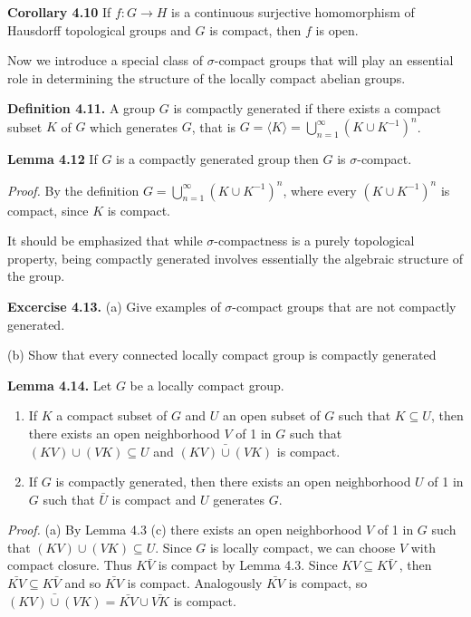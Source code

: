 \documentclass[12pt]{article}
\begin{document}
\textbf{Corollary 4.10} If $f : G \to H$ is a continuous surjective homomorphism of Hausdorff topological groups and
$G$ is compact, then $f$ is open.


Now we introduce a special class of $\sigma$-compact groups that will play an essential role in determining the
structure of the locally compact abelian groups.


\textbf{Definition 4.11.} A group $G$ is compactly generated if there exists a compact subset $K$ of $G$ which generates
$G$, that is $G = \langle K \rangle =\bigcup^{\infty}_{n=1}(K \cup K^{-1})^n$.


\textbf{Lemma 4.12} If $G$ is a compactly generated group then $G$ is $\sigma$-compact.


\emph{Proof.} By the definition $G =\bigcup^{\infty}_{n=1}(K \cup K^{-1})^n$, where every $(K \cup K^{-1})^n$ is compact, since $K$ is compact.


    It should be emphasized that while $\sigma$-compactness is a purely topological property, being compactly
    generated involves essentially the algebraic structure of the group.


\textbf{Excercise 4.13.} (a) Give examples of $\sigma$-compact groups that are not compactly generated.


(b) Show that every connected locally compact group is compactly generated


\textbf{Lemma 4.14.} Let $G$ be a locally compact group.


\begin{enumerate}

    \item If $K$ a compact subset of $G$ and $U$ an open subset of $G$ such that $K \subseteq U$, then there exists an open
    neighborhood $V$ of 1 in $G$ such that $(KV) \cup (VK) \subseteq U$ and $\bar{(KV) \cup (VK)}$ is compact.
    
    \item If $G$ is compactly generated, then there exists an open neighborhood $U$ of 1 in $G$ such that $\bar{U}$ is compact
    and $U$ generates $G$.

\end{enumerate}


\emph{Proof.} (a) By Lemma 4.3 (c) there exists an open neighborhood $V$ of 1 in $G$ such that $(KV) \cup (VK) \subseteq U$.
Since $G$ is locally compact, we can choose $V$ with compact closure. Thus $K\bar{V}$ is compact by Lemma 4.3. Since
$KV \subseteq K\bar{V}$ , then $\bar{KV} \subseteq K \bar{V}$ and so $\bar{KV}$ is compact. Analogously $\bar{KV}$ is compact, so $\bar{(KV) \cup (VK)} = \bar{KV} \cup \bar{VK}$
is compact.
\end{document}
